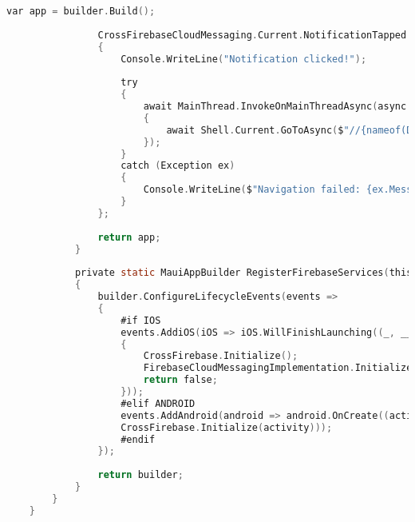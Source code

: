 \begin{lstlisting}[language=C, caption=Firebase initialisatie en dependency injection, label=lst:pushnotification-mauiprogram]
                var app = builder.Build();
                
                CrossFirebaseCloudMessaging.Current.NotificationTapped += async (sender, e) =>
                {
                    Console.WriteLine("Notification clicked!");
                    
                    try
                    {
                        await MainThread.InvokeOnMainThreadAsync(async () =>
                        {
                            await Shell.Current.GoToAsync($"//{nameof(DataPage)}");
                        });
                    }
                    catch (Exception ex)
                    {
                        Console.WriteLine($"Navigation failed: {ex.Message}");
                    }
                };
                
                return app;
            }
            
            private static MauiAppBuilder RegisterFirebaseServices(this MauiAppBuilder builder)
            {
                builder.ConfigureLifecycleEvents(events =>
                {
                    #if IOS
                    events.AddiOS(iOS => iOS.WillFinishLaunching((_, __) =>
                    {
                        CrossFirebase.Initialize();
                        FirebaseCloudMessagingImplementation.Initialize();
                        return false;
                    }));
                    #elif ANDROID
                    events.AddAndroid(android => android.OnCreate((activity, _) =>
                    CrossFirebase.Initialize(activity)));
                    #endif
                });
                
                return builder;
            }
        }
    }
\end{lstlisting}
